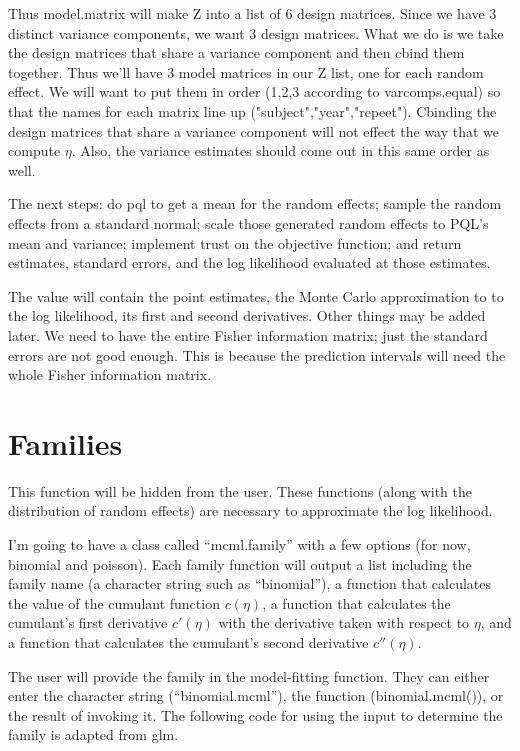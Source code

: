 \documentclass{article}
\begin{document}
Thus model.matrix will make Z into a list of 6 design matrices. Since we have 3 distinct variance components, we want 3 design matrices. What we do is we take the design matrices that share a variance component and then cbind them together. Thus we'll have 3 model matrices in our Z list, one for each random effect. We will want to put them in order (1,2,3 according to varcomps.equal) so that the names for each matrix line up ("subject","year","repeet").  Cbinding the design matrices that share a variance component will not effect the way that we compute $\eta$.  Also, the variance estimates should come out in this same order as well.
    
    The next steps: do pql to get a mean for the random effects;  sample the random effects from a standard normal; scale those generated random effects to PQL's mean and variance; implement trust on the objective function; and return estimates, standard errors, and the log likelihood evaluated at those estimates.

The value will contain the point estimates, the Monte Carlo approximation to to the log likelihood, its first and second derivatives. Other things may be added later. We need to have the entire Fisher information matrix; just the standard errors are not good enough. This is because the prediction intervals will need the whole Fisher information matrix.

\section{Families} \label{sec:fam}
This function will be hidden from the user.  These functions (along with the distribution of random effects) are necessary to approximate the log likelihood.

I'm going to have a class called ``mcml.family'' with a few options (for now, binomial and poisson). Each family  function will output a list including the family name (a character string such as ``binomial''), a function that calculates the value of the cumulant function $c(\eta)$,  a function that calculates the cumulant's first derivative $c'(\eta)$ with the derivative taken with respect to $\eta$, and  a function that calculates the cumulant's second derivative $c''(\eta)$. 

The user will provide the family in the model-fitting function. They can either enter the character string (``binomial.mcml''), the function (binomial.mcml()), or the result of invoking it.  The following code for using the input to determine the family is adapted from glm.
\end{document}
